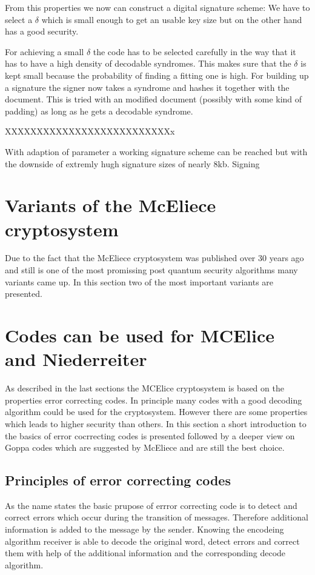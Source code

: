 From this properties we now can construct a digital signature scheme: We have to select a $\delta$ which is small enough to get an usable key size but on the other hand has a good security. 

For achieving a small $\delta$ the code has to be selected carefully in the way that it has to have a high density of decodable syndromes. This makes sure that the $\delta$ is kept small because the probability of finding a fitting one is high. For building up a signature the signer now takes a syndrome and hashes it together with the document. This is tried with an modified document (possibly with some kind of padding) as long as he gets a decodable syndrome. \cite{courtois2001achieve}


XXXXXXXXXXXXXXXXXXXXXXXXXXx

With adaption of parameter a working signature scheme can be reached but with the downside of extremly hugh signature sizes of nearly 8kb. 
Signing

\section{Variants of the McEliece cryptosystem}
Due to the fact that the McEliece cryptosystem was published over 30 years ago and still is one of the most promissing post quantum security algorithms many variants came up. In this section two of the most important variants are presented. 

\section{Codes can be used for MCElice and Niederreiter} 
As described in the last sections the MCElice cryptosystem is based on the properties error correcting codes. In principle many codes with a good decoding algorithm could be used for the cryptosystem. However there are some properties which leads to higher security than others. In this section a short introduction to the basics of error cocrrecting codes is presented followed by a deeper view on Goppa codes which are suggested by McEliece and are still the best choice.

\subsection{Principles of error correcting codes}
As the name states the basic prupose of errror correcting code is to detect and correct errors which occur during the transition of messages. Therefore additional information is added to the message by the sender. Knowing the encodeing algorithm receiver is able to decode the original word, detect errors and correct them with help of the additional information and the corresponding decode algorithm. 

